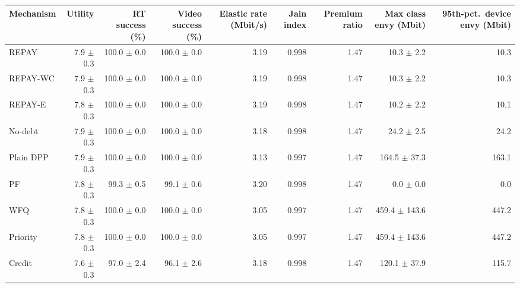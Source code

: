 \begin{tabular}{lrrrrrrrr}
\toprule
Mechanism & Utility & RT success (\%) & Video success (\%) & Elastic rate (Mbit/s) & Jain index & Premium ratio & Max class envy (Mbit) & 95th-pct.\ device envy (Mbit) \\
\midrule
REPAY & 7.9 $\pm$ 0.3 & 100.0 $\pm$ 0.0 & 100.0 $\pm$ 0.0 & 3.19 & 0.998 & 1.47 & 10.3 $\pm$ 2.2 & 10.3 \\
REPAY-WC & 7.9 $\pm$ 0.3 & 100.0 $\pm$ 0.0 & 100.0 $\pm$ 0.0 & 3.19 & 0.998 & 1.47 & 10.3 $\pm$ 2.2 & 10.3 \\
REPAY-E & 7.8 $\pm$ 0.3 & 100.0 $\pm$ 0.0 & 100.0 $\pm$ 0.0 & 3.19 & 0.998 & 1.47 & 10.2 $\pm$ 2.2 & 10.1 \\
No-debt & 7.9 $\pm$ 0.3 & 100.0 $\pm$ 0.0 & 100.0 $\pm$ 0.0 & 3.18 & 0.998 & 1.47 & 24.2 $\pm$ 2.5 & 24.2 \\
Plain DPP & 7.9 $\pm$ 0.3 & 100.0 $\pm$ 0.0 & 100.0 $\pm$ 0.0 & 3.13 & 0.997 & 1.47 & 164.5 $\pm$ 37.3 & 163.1 \\
PF & 7.8 $\pm$ 0.3 & 99.3 $\pm$ 0.5 & 99.1 $\pm$ 0.6 & 3.20 & 0.998 & 1.47 & 0.0 $\pm$ 0.0 & 0.0 \\
WFQ & 7.8 $\pm$ 0.3 & 100.0 $\pm$ 0.0 & 100.0 $\pm$ 0.0 & 3.05 & 0.997 & 1.47 & 459.4 $\pm$ 143.6 & 447.2 \\
Priority & 7.8 $\pm$ 0.3 & 100.0 $\pm$ 0.0 & 100.0 $\pm$ 0.0 & 3.05 & 0.997 & 1.47 & 459.4 $\pm$ 143.6 & 447.2 \\
Credit & 7.6 $\pm$ 0.3 & 97.0 $\pm$ 2.4 & 96.1 $\pm$ 2.6 & 3.18 & 0.998 & 1.47 & 120.1 $\pm$ 37.9 & 115.7 \\
\bottomrule
\end{tabular}
